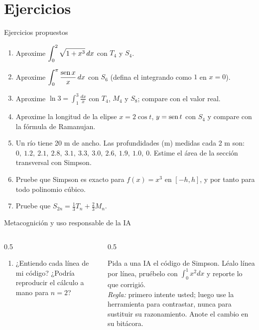 \documentclass[10pt,aspectratio=169]{beamer}
\begin{document}
\section{Ejercicios}

\begin{frame}{Ejercicios propuestos}
  \small
  \begin{ejercicio}
    \begin{enumerate}
      \item Aproxime $\displaystyle\int_0^2\sqrt{1+x^3}\,dx$ con $T_4$ y $S_4$.
      \item Aproxime $\displaystyle\int_0^{\pi}\frac{\operatorname{sen} x}{x}\,dx$ con $S_6$ (defina el integrando como $1$ en $x=0$).
      \item Aproxime $\ln3=\displaystyle\int_1^3\frac{dx}{x}$ con $T_4$, $M_4$ y $S_8$; compare con el valor real.
      \item Aproxime la longitud de la elipse $x=2\cos t$, $y=\operatorname{sen} t$ con $S_4$ y compare con la fórmula de Ramanujan.
      \item Un río tiene 20 m de ancho. Las profundidades (m) medidas cada 2 m son:
        $0,\ 1.2,\ 2.1,\ 2.8,\ 3.1,\ 3.3,\ 3.0,\ 2.6,\ 1.9,\ 1.0,\ 0$. Estime el área de la sección transversal con Simpson.
      \item Pruebe que Simpson es exacto para $f(x)=x^3$ en $[-h,h]$, y por tanto para todo polinomio cúbico.
      \item Pruebe que $S_{2n}=\frac13T_n+\frac23M_n$.
    \end{enumerate}
  \end{ejercicio}
\end{frame}

\begin{frame}{Metacognición y uso responsable de la IA}
  \small
  \begin{columns}[t]
    \begin{column}{0.5\textwidth}
      \begin{metacog}
        \begin{enumerate}
          \metacomun
          \item ¿Entiendo cada línea de mi código? ¿Podría reproducir el cálculo a mano para $n=2$?
        \end{enumerate}
      \end{metacog}
    \end{column}
    \begin{column}{0.5\textwidth}
      \begin{iabox}
        Pida a una IA el código de Simpson. Léalo línea por línea, pruébelo con $\int_0^1x^2dx$ y reporte lo que corrigió.\\[2pt]
        \textit{Regla:} primero intente usted; luego use la herramienta para contrastar, nunca para sustituir su razonamiento. Anote el cambio en su bitácora.
      \end{iabox}
    \end{column}
  \end{columns}
\end{frame}
\end{document}
